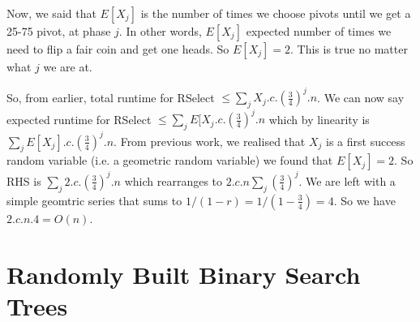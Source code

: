 Now, we said that $E[X_{j}]$ is the number of times we choose pivots until we get a 25-75 pivot, at phase $j$.
In other words, $E[X_{j}]$ expected number of times we need to flip a fair coin and get one heads. 
So  $E[X_{j}] = 2$. This is true no matter what $j$ we are at. 

So, from earlier, total runtime for RSelect $\leqslant \sum_{j} X_j.c.(\frac{3}{4})^j.n$. 
We can now say expected runtime for RSelect $\leqslant \sum_{j} E[X_j.c.(\frac{3}{4})^j.n$
which by linearity is $\sum_{j} E[X_j].c.(\frac{3}{4})^j.n$. From previous work, we realised
that $X_j$ is a first success random variable (i.e. a geometric random variable) 
we found that $E[X_j] = 2$. So RHS is $\sum_{j} 2.c.(\frac{3}{4})^j.n$ which
rearranges to $2.c.n \sum_{j} (\frac{3}{4})^j$. We are left with a simple 
geomtric series that sums to $1/(1-r) = 1/(1-\frac{3}{4}) = 4$. 
So we have $2.c.n.4 = O(n)$. 


\frmrule



\section{Randomly Built Binary Search Trees}
